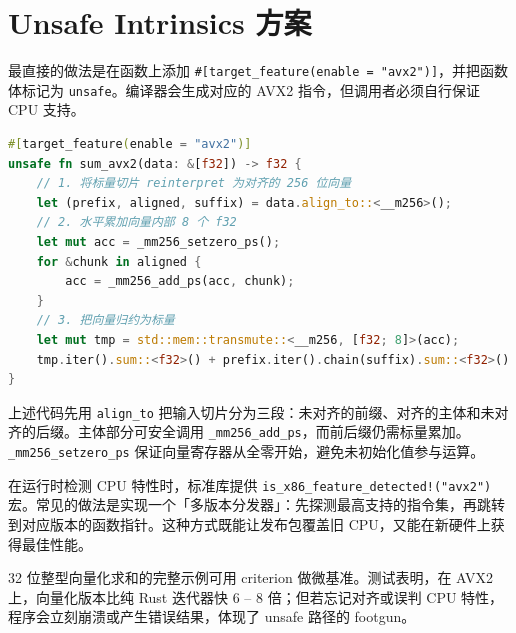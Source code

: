\chapter{Unsafe Intrinsics 方案}
最直接的做法是在函数上添加 \texttt{\#{}[target\_{}feature(enable = "avx2")]}，并把函数体标记为 \texttt{unsafe}。编译器会生成对应的 AVX2 指令，但调用者必须自行保证 CPU 支持。\par
\begin{lstlisting}[language=rust]
#[target_feature(enable = "avx2")]
unsafe fn sum_avx2(data: &[f32]) -> f32 {
    // 1. 将标量切片 reinterpret 为对齐的 256 位向量
    let (prefix, aligned, suffix) = data.align_to::<__m256>();
    // 2. 水平累加向量内部 8 个 f32
    let mut acc = _mm256_setzero_ps();
    for &chunk in aligned {
        acc = _mm256_add_ps(acc, chunk);
    }
    // 3. 把向量归约为标量
    let mut tmp = std::mem::transmute::<__m256, [f32; 8]>(acc);
    tmp.iter().sum::<f32>() + prefix.iter().chain(suffix).sum::<f32>()
}
\end{lstlisting}
上述代码先用 \texttt{align\_{}to} 把输入切片分为三段：未对齐的前缀、对齐的主体和未对齐的后缀。主体部分可安全调用 \texttt{\_{}mm256\_{}add\_{}ps}，而前后缀仍需标量累加。\texttt{\_{}mm256\_{}setzero\_{}ps} 保证向量寄存器从全零开始，避免未初始化值参与运算。\par
在运行时检测 CPU 特性时，标准库提供 \texttt{is\_{}x86\_{}feature\_{}detected!("avx2")} 宏。常见的做法是实现一个「多版本分发器」：先探测最高支持的指令集，再跳转到对应版本的函数指针。这种方式既能让发布包覆盖旧 CPU，又能在新硬件上获得最佳性能。\par
32 位整型向量化求和的完整示例可用 criterion 做微基准。测试表明，在 AVX2 上，向量化版本比纯 Rust 迭代器快 6 – 8 倍；但若忘记对齐或误判 CPU 特性，程序会立刻崩溃或产生错误结果，体现了 unsafe 路径的 footgun。\par
